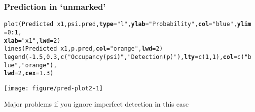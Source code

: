\documentclass[color=usenames,dvipsnames]{beamer}\usepackage[]{graphicx}\usepackage[]{xcolor}
\makeatletter
\newcommand{\hlnum}[1]{\textcolor[rgb]{0.69,0.494,0}{#1}}%
\newcommand{\hlsng}[1]{\textcolor[rgb]{0.749,0.012,0.012}{#1}}%
\newcommand{\hlopt}[1]{\textcolor[rgb]{0,0,0}{#1}}%
\newcommand{\hldef}[1]{\textcolor[rgb]{0,0,0}{#1}}%
\newcommand{\hlkwc}[1]{\textcolor[rgb]{0,0,0}{\textbf{#1}}}%
\newcommand{\hlkwd}[1]{\textcolor[rgb]{0.004,0.004,0.506}{#1}}%
\newenvironment{kframe}{%
 \def\at@end@of@kframe{}%
 \ifinner\ifhmode%
  \def\at@end@of@kframe{\end{minipage}}%
  \begin{minipage}{\columnwidth}%
 \fi\fi%
 \def\FrameCommand##1{\hskip\@totalleftmargin \hskip-\fboxsep
 \colorbox{shadecolor}{##1}\hskip-\fboxsep
     \hskip-\linewidth \hskip-\@totalleftmargin \hskip\columnwidth}%
 \MakeFramed {\advance\hsize-\width
   \@totalleftmargin\z@ \linewidth\hsize
   \@setminipage}}%
 {\par\unskip\endMakeFramed%
 \at@end@of@kframe}
\newenvironment{knitrout}{}{} %
\makeatother
\begin{document}




\begin{frame}[fragile]
  \frametitle{Prediction in `unmarked'}
\begin{knitrout}\tiny
{}\color{fgcolor}\begin{kframe}
\begin{alltt}
\hlkwd{plot}\hldef{(Predicted} \hlopt{~} \hldef{x1, psi.pred,} \hlkwc{type}\hldef{=}\hlsng{"l"}\hldef{,} \hlkwc{ylab}\hldef{=}\hlsng{"Probability"}\hldef{,} \hlkwc{col}\hldef{=}\hlsng{"blue"}\hldef{,} \hlkwc{ylim}\hldef{=}\hlnum{0}\hlopt{:}\hlnum{1}\hldef{,}
     \hlkwc{xlab}\hldef{=}\hlsng{"x1"}\hldef{,} \hlkwc{lwd}\hldef{=}\hlnum{2}\hldef{)}
\hlkwd{lines}\hldef{(Predicted} \hlopt{~} \hldef{x1, p.pred,} \hlkwc{col}\hldef{=}\hlsng{"orange"}\hldef{,} \hlkwc{lwd}\hldef{=}\hlnum{2}\hldef{)}
\hlkwd{legend}\hldef{(}\hlopt{-}\hlnum{1.5}\hldef{,} \hlnum{0.3}\hldef{,} \hlkwd{c}\hldef{(}\hlsng{"Occupancy (psi)"}\hldef{,} \hlsng{"Detection (p)"}\hldef{),} \hlkwc{lty}\hldef{=}\hlkwd{c}\hldef{(}\hlnum{1}\hldef{,} \hlnum{1}\hldef{),} \hlkwc{col}\hldef{=}\hlkwd{c}\hldef{(}\hlsng{"blue"}\hldef{,} \hlsng{"orange"}\hldef{),}
       \hlkwc{lwd}\hldef{=}\hlnum{2}\hldef{,} \hlkwc{cex}\hldef{=}\hlnum{1.3}\hldef{)}
\end{alltt}
\end{kframe}

{\centering \texttt{[image: figure/pred-plot2-1]} 

}


\end{knitrout}
\footnotesize
\centering
Major problems if you ignore imperfect detection in this case \\
\end{frame}
\end{document}
